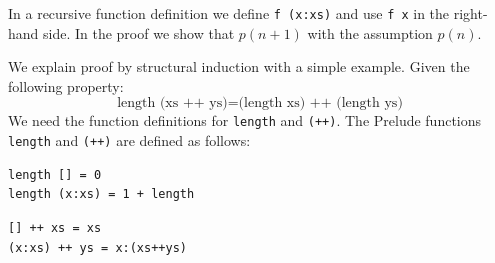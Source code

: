 In a recursive function definition we define \verb|f (x:xs)| and use \verb|f x| in the right-hand side. In the proof we show that $p(n+1)$ with the assumption $p(n)$.

We explain proof by structural induction with a simple example. Given the following property:
\begin{equation}
  \label{eq:lengthprop}
  \text{length (xs ++ ys)} = \text{(length xs) ++ (length ys)}
\end{equation}
We need the function definitions for \verb|length| and \verb|(++)|.
The Prelude functions \verb|length| and \verb|(++)| are defined as follows:
\begin{verbatim}
length [] = 0
length (x:xs) = 1 + length 
\end{verbatim}

\begin{verbatim}
[] ++ xs = xs
(x:xs) ++ ys = x:(xs++ys)
\end{verbatim}

